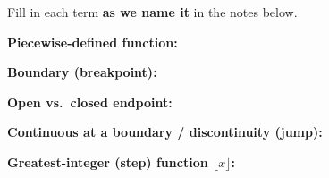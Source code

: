 \newcommand{\vrowheight}{2.0cm}
\newcommand{\vterm}[1]{%
  \par\noindent\begin{minipage}[t][\vrowheight][t]{\linewidth}%
    \vspace*{6pt}\textbf{\textcolor{forest}{#1:}}%
  \end{minipage}\par}
\newcommand{\lgrid}[4]{%
  \draw[step=1, linegray!40, very thin] (#1,#3) grid (#2,#4);
  \draw[->, semithick, charcoal] (#1,0)--(#2,0) node[below right, font=\scriptsize]{$x$};
  \draw[->, semithick, charcoal] (0,#3)--(0,#4) node[left, font=\scriptsize]{$y$};}
\newcommand{\mgrid}{%
  \draw[step=1, linegray!40, very thin] (0,0) grid (7,4);
  \draw[->, semithick, charcoal] (0,0)--(7.6,0) node[below right, font=\scriptsize]{$m$};
  \draw[->, semithick, charcoal] (0,0)--(0,4.6) node[left, font=\scriptsize]{\$};
  \foreach \x in {1,...,7}{\node[below, font=\tiny, charcoal] at (\x,0){$\x$};}
  \foreach \y/\lab in {1/12,2/24,3/36,4/48}{\node[left, font=\tiny, charcoal] at (0,\y){$\lab$};}}
\newcommand{\fdot}[3]{\fill[#1] (#2,#3) circle (3.2pt);}
\newcommand{\hdot}[3]{\draw[very thick, #1, fill=white] (#2,#3) circle (3.2pt);}




\vspace{6pt}

\begin{vocabbox}
\small
Fill in each term \textbf{as we name it} in the notes below.
\vterm{Piecewise-defined function}
\vterm{Boundary (breakpoint)}
\vterm{Open vs.\ closed endpoint}
\vterm{Continuous at a boundary / discontinuity (jump)}
\vterm{Greatest-integer (step) function $\lfloor x\rfloor$}
\end{vocabbox}

\vspace{8pt}

